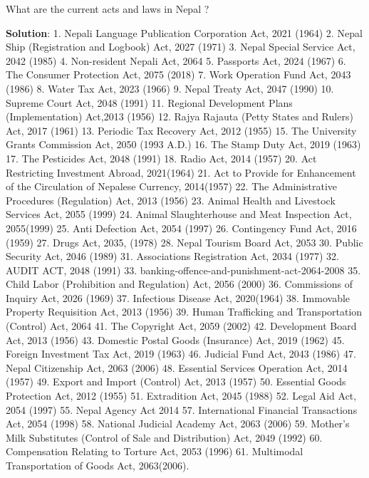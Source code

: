 \documentclass[
  openany]{book}
\newcommand{\question}{\item}
\newenvironment{solution}{ {\bfseries Solution}:}{}
\begin{document}
\begin{questions}

\question What are the current acts and laws in Nepal ?

\begin{solution}
1. Nepali Language Publication Corporation Act, 2021 (1964)
2. Nepal Ship (Registration and Logbook) Act, 2027 (1971)
3. Nepal Special Service Act, 2042 (1985)
4. Non-resident Nepali Act, 2064
5. Passports Act, 2024 (1967)
6. The Consumer Protection Act, 2075 (2018)
7. Work Operation Fund Act, 2043 (1986)
8. Water Tax Act, 2023 (1966)
9. Nepal Treaty Act, 2047 (1990)
10. Supreme Court Act, 2048 (1991)
11. Regional Development Plans (Implementation) Act,2013 (1956)
12. Rajya Rajauta (Petty States and Rulers) Act, 2017 (1961)
13. Periodic Tax Recovery Act, 2012 (1955)
15. The University Grants Commission Act, 2050 (1993 A.D.)
16. The Stamp Duty Act, 2019 (1963)
17. The Pesticides Act, 2048 (1991)
18. Radio Act, 2014 (1957)
20. Act Restricting Investment Abroad, 2021(1964)
21. Act to Provide for Enhancement of the Circulation of Nepalese Currency, 2014(1957)
22. The Administrative Procedures (Regulation) Act, 2013 (1956)
23. Animal Health and Livestock Services Act, 2055 (1999)
24. Animal Slaughterhouse and Meat Inspection Act, 2055(1999)
25. Anti Defection Act, 2054 (1997)
26. Contingency Fund Act, 2016 (1959)
27. Drugs Act, 2035, (1978)
28. Nepal Tourism Board Act, 2053
30. Public Security Act, 2046 (1989)
31. Associations Registration Act, 2034 (1977)
32. AUDIT ACT, 2048 (1991)
33. banking-offence-and-punishment-act-2064-2008
35. Child Labor (Prohibition and Regulation) Act, 2056 (2000)
36. Commissions of Inquiry Act, 2026 (1969)
37. Infectious Disease Act, 2020(1964)
38. Immovable Property Requisition Act, 2013 (1956)
39. Human Trafficking and Transportation (Control) Act, 2064
41. The Copyright Act, 2059 (2002)
42. Development Board Act, 2013 (1956)
43. Domestic Postal Goods (Insurance) Act, 2019 (1962)
45. Foreign Investment Tax Act, 2019 (1963)
46. Judicial Fund Act, 2043 (1986)
47. Nepal Citizenship Act, 2063 (2006)
48. Essential Services Operation Act, 2014 (1957)
49. Export and Import (Control) Act, 2013 (1957)
50. Essential Goods Protection Act, 2012 (1955)
51. Extradition Act, 2045 (1988)
52. Legal Aid Act, 2054 (1997)
55. Nepal Agency Act 2014
57. International Financial Transactions Act, 2054 (1998)
58. National Judicial Academy Act, 2063 (2006)
59. Mother's Milk Substitutes (Control of Sale and Distribution) Act, 2049 (1992)
60. Compensation Relating to Torture Act, 2053 (1996)
61. Multimodal Transportation of Goods Act, 2063(2006).

\end{solution}
\end{questions}
\end{document}
